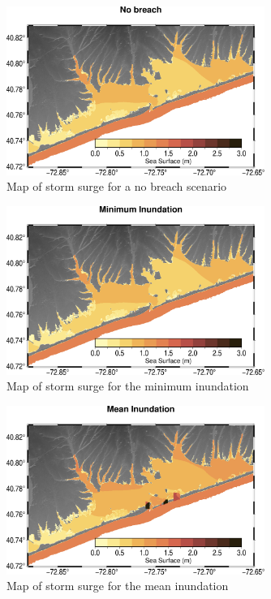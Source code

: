 \documentclass{coastal_paper}
\begin{document}
\begin{figure}
    \centering
    \includegraphics[width=0.75\textwidth]{images/Nobreach.pdf}
    \caption{Map of storm surge for a no breach scenario}
    \label{fig4}
\end{figure}
\begin{figure}
    \centering
    \includegraphics[width=0.75\textwidth]{images/min_inundation.pdf}
    \caption{Map of storm surge for the minimum inundation}
    \label{fig5}
\end{figure}
\begin{figure}
    \centering
    \includegraphics[width=0.75\textwidth]{images/mean_inundation.pdf}
    \caption{Map of storm surge for the mean inundation}
    \label{fig6}
\end{figure}
\end{document}
